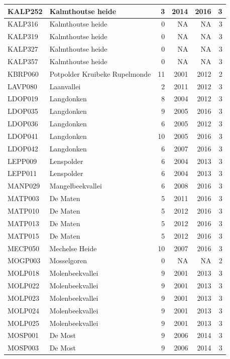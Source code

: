 \documentclass[11pt,]{book}
\begin{document}
\begin{table}
\begin{tabular}[t]{l|l|r|r|r|r}
\hline
KALP252 & Kalmthoutse heide & 3 & 2014 & 2016 & 3\\
\hline
KALP316 & Kalmthoutse heide & 0 & NA & NA & 3\\
\hline
KALP319 & Kalmthoutse heide & 0 & NA & NA & 3\\
\hline
KALP327 & Kalmthoutse heide & 0 & NA & NA & 3\\
\hline
KALP357 & Kalmthoutse heide & 0 & NA & NA & 3\\
\hline
KBRP060 & Potpolder Kruibeke Rupelmonde & 11 & 2001 & 2012 & 2\\
\hline
LAVP080 & Laanvallei & 2 & 2011 & 2012 & 3\\
\hline
LDOP019 & Langdonken & 8 & 2004 & 2012 & 3\\
\hline
LDOP035 & Langdonken & 9 & 2005 & 2016 & 3\\
\hline
LDOP036 & Langdonken & 6 & 2005 & 2012 & 3\\
\hline
LDOP041 & Langdonken & 10 & 2005 & 2016 & 3\\
\hline
LDOP042 & Langdonken & 6 & 2007 & 2016 & 3\\
\hline
LEPP009 & Lenspolder & 6 & 2004 & 2013 & 3\\
\hline
LEPP011 & Lenspolder & 6 & 2004 & 2013 & 3\\
\hline
MANP029 & Mangelbeekvallei & 6 & 2008 & 2016 & 3\\
\hline
MATP003 & De Maten & 5 & 2011 & 2016 & 3\\
\hline
MATP010 & De Maten & 5 & 2012 & 2016 & 3\\
\hline
MATP013 & De Maten & 5 & 2012 & 2016 & 3\\
\hline
MATP015 & De Maten & 5 & 2012 & 2016 & 3\\
\hline
MECP050 & Mechelse Heide & 10 & 2007 & 2016 & 3\\
\hline
MOGP003 & Mosselgoren & 0 & NA & NA & 2\\
\hline
MOLP018 & Molenbeekvallei & 9 & 2001 & 2013 & 3\\
\hline
MOLP022 & Molenbeekvallei & 9 & 2001 & 2013 & 3\\
\hline
MOLP023 & Molenbeekvallei & 9 & 2001 & 2013 & 3\\
\hline
MOLP024 & Molenbeekvallei & 9 & 2001 & 2013 & 3\\
\hline
MOLP025 & Molenbeekvallei & 9 & 2001 & 2013 & 3\\
\hline
MOSP001 & De Most & 9 & 2006 & 2014 & 3\\
\hline
MOSP003 & De Most & 9 & 2006 & 2014 & 3\\

\end{tabular}
\end{table}
\end{document}
